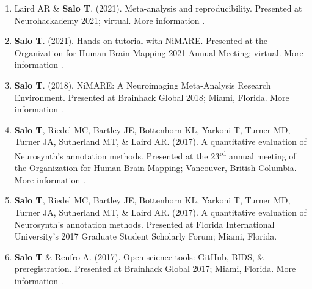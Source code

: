 \documentclass[10pt]{article}
\newcommand{\sectionstyle}{\LARGE \fontfamily{lmr}\selectfont}
\newcommand{\textlink}[3][blue]{\href{#2}{\color{#1}{#3}}}
\begin{document}
\begin{enumerate}

	\item Laird AR \& \textbf{Salo T}.
	(2021).
	Meta-analysis and reproducibility.
	Presented at Neurohackademy 2021; virtual.
	More information \textlink{https://neurohackademy.org/course/meta-analysis-and-reproducibility-3/}{here}.

	\item \textbf{Salo T}.
	(2021).
	Hands-on tutorial with NiMARE.
	Presented at the Organization for Human Brain Mapping 2021 Annual Meeting; virtual.
	More information \textlink{https://nbclab.github.io/talks/salo-ohbm-nimare}{here}.

	\item \textbf{Salo T}.
	(2018).
	NiMARE: A Neuroimaging Meta-Analysis Research Environment.
	Presented at Brainhack Global 2018; Miami, Florida.
	More information \textlink{https://www.slideshare.net/TaylorSalo/nimarebrainhackglobalmiami}{here}.

	\item \textbf{Salo T}, Riedel MC, Bartley JE, Bottenhorn KL, Yarkoni T, Turner MD, Turner JA, Sutherland MT, \& Laird AR.
	(2017).
	A quantitative evaluation of Neurosynth's annotation methods.
	Presented at the 23\textsuperscript{rd} annual meeting of the Organization for Human Brain Mapping; Vancouver, British Columbia.
	More information \textlink{https://nbclab.github.io/presentations/salo-neurosynth-presentation}{here}.

	\item \textbf{Salo T}, Riedel MC, Bartley JE, Bottenhorn KL, Yarkoni T, Turner MD, Turner JA, Sutherland MT, \& Laird AR.
	(2017).
	A quantitative evaluation of Neurosynth's annotation methods.
	Presented at Florida International University's 2017 Graduate Student Scholarly Forum;
	Miami, Florida.

	\item \textbf{Salo T} \& Renfro A.
	(2017).
	Open science tools: GitHub, BIDS, \& preregistration.
	Presented at Brainhack Global 2017; Miami, Florida.
	More information \textlink{https://osf.io/557vf}{here}.

\end{enumerate}

\bigskip

\begin{center}\sectionstyle{POSTERS}\end{center}
\end{document}

